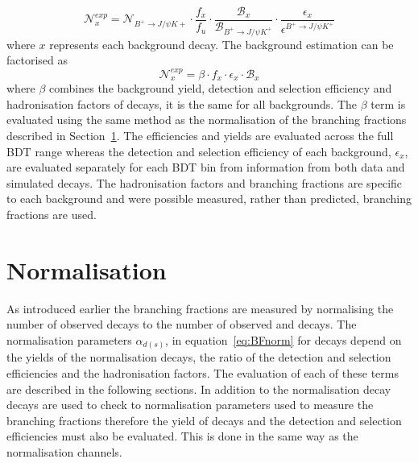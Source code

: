 {{\begin{equation}
\mathcal{N}^{exp}_{x} = \mathcal{N}_{B^{+} \to J/\psi K{+}} \cdot \frac{f_{x}}{f_{u}} \cdot \frac{\mathcal{B}_{x}}{\mathcal{B}_{B^{+} \to J/\psi K^{+}}} \cdot \frac{\epsilon_{x}}{\epsilon^{B^{+} \to J/\psi K^{+}}} 
\label{eq:BkgndPredict}
\end{equation}
where $x$ represents each background decay. The background estimation can be factorised as
\begin{equation}
\mathcal{N}^{exp}_{x} = \beta \cdot f_{x} \cdot \epsilon_{x} \cdot \mathcal{B}_{x}
\label{eq:BkgndPredict2}
\end{equation}
where $\beta$ combines the background yield, detection and selection efficiency and hadronisation factors of \bujpsik decays, it is the same for all backgrounds. The $\beta$ term is evaluated using the same method as the normalisation of the \bmumu branching fractions described in Section~\ref{sec:Normalisation}. The \bujpisk efficiencies and yields are evaluated across the full BDT range whereas the detection and selection efficiency of each background, $ \epsilon_{x}$, are evaluated separately for each BDT bin from information from both data and simulated decays. The hadronisation factors and branching fractions are specific to each background and were possible measured, rather than predicted, branching fractions are used. %

\section{Normalisation}
\label{sec:Normalisation}

As introduced earlier the \bmumu branching fractions are measured by normalising the number of observed \bmumu decays to the number of observed \bujpsik and \bdkpi decays. 
The normalisation parameters $\alpha_{d(s)}$, in equation~\ref{eq:BFnorm} for \bmumu decays depend on the yields of the normalisation decays, the ratio of the detection and selection efficiencies and the hadronisation factors. The evaluation of each of these terms are described in the following sections.
In addition to the normalisation decay \bsjpsiphi decays are used to check to normalisation parameters used to measure the \bmumu branching fractions therefore the yield of \bsjpisphi decays and the detection and selection efficiencies must also be evaluated. This is done in the same way as the normalisation channels.


}}
